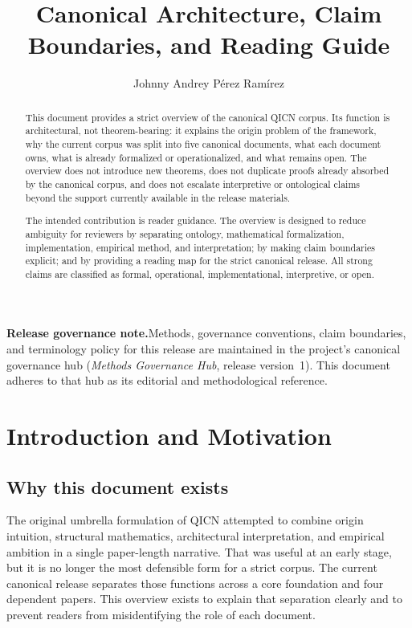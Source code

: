\documentclass[11pt,a4paper]{article}
\title{\textbf{Canonical Architecture, Claim Boundaries, and Reading Guide}}
\author{Johnny Andrey P\'{e}rez Ram\'{i}rez}
\date{}
\begin{document}
\maketitle

\begin{abstract}
This document provides a strict overview of the canonical QICN corpus. Its function is architectural, not theorem-bearing: it explains the origin problem of the framework, why the current corpus was split into five canonical documents, what each document owns, what is already formalized or operationalized, and what remains open. The overview does not introduce new theorems, does not duplicate proofs already absorbed by the canonical corpus, and does not escalate interpretive or ontological claims beyond the support currently available in the release materials.

The intended contribution is reader guidance. The overview is designed to reduce ambiguity for reviewers by separating ontology, mathematical formalization, implementation, empirical method, and interpretation; by making claim boundaries explicit; and by providing a reading map for the strict canonical release. All strong claims are classified as formal, operational, implementational, interpretive, or open.
\end{abstract}

\noindent\textbf{Release governance note.}\enspace Methods, governance conventions, claim boundaries, and terminology policy for this release are maintained in the project's canonical governance hub (\textit{Methods Governance Hub}, release version~1). This document adheres to that hub as its editorial and methodological reference.

\tableofcontents
\newpage

\section{Introduction and Motivation}

\subsection{Why this document exists}

The original umbrella formulation of QICN attempted to combine origin intuition, structural mathematics, architectural interpretation, and empirical ambition in a single paper-length narrative. That was useful at an early stage, but it is no longer the most defensible form for a strict corpus. The current canonical release separates those functions across a core foundation and four dependent papers. This overview exists to explain that separation clearly and to prevent readers from misidentifying the role of each document.
\end{document}
